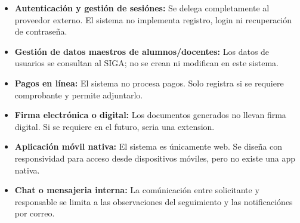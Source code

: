 \begin{itemize}
    \item \textbf{Autenticación y gestión de sesiónes:} Se delega completamente al proveedor externo. El sistema no implementa registro, login ni recuperación de contraseña.
    \item \textbf{Gestión de datos maestros de alumnos/docentes:} Los datos de usuarios se consultan al SIGA; no se crean ni modifican en este sistema.
    \item \textbf{Pagos en línea:} El sistema no procesa pagos. Solo registra si se requiere comprobante y permite adjuntarlo.
    \item \textbf{Firma electrónica o digital:} Los documentos generados no llevan firma digital. Si se requiere en el futuro, seria una extension.
    \item \textbf{Aplicación móvil nativa:} El sistema es únicamente web. Se diseña con responsividad para acceso desde dispositivos móviles, pero no existe una app nativa.
    \item \textbf{Chat o mensajeria interna:} La comúnicación entre solicitante y responsable se limita a las observaciones del seguimiento y las notificaciónes por correo.
\end{itemize}
